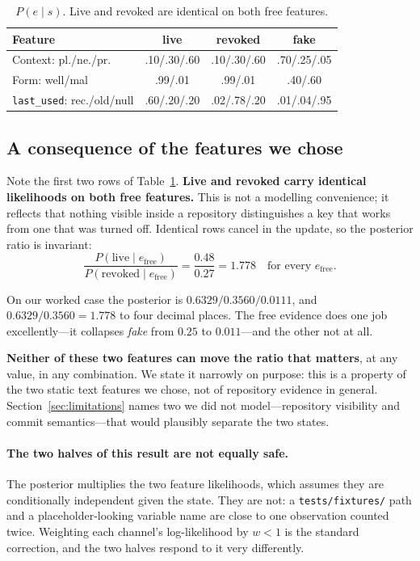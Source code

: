 \documentclass{article}
\begin{document}
\begin{table}[t]
\centering
\footnotesize
\setlength{\tabcolsep}{4pt}
\begin{tabular}{lccc}
\toprule
\textbf{Feature} & \textbf{live} & \textbf{revoked} & \textbf{fake} \\
\midrule
Context: pl./ne./pr. & .10/.30/.60 & .10/.30/.60 & .70/.25/.05 \\
Form: well/mal & .99/.01 & .99/.01 & .40/.60 \\
\texttt{last\_used}: rec./old/null & .60/.20/.20 & .02/.78/.20 & .01/.04/.95 \\
\bottomrule
\end{tabular}
\caption{$P(e \mid s)$. Live and revoked are identical on both free features.}
\label{tab:likelihoods}
\end{table}

\subsection{A consequence of the features we chose}
\label{sec:invariance}

Note the first two rows of Table~\ref{tab:likelihoods}. \textbf{Live and revoked
carry identical likelihoods on both free features.} This is not a modelling
convenience; it reflects that nothing visible inside a repository distinguishes
a key that works from one that was turned off. Identical rows cancel in the
update, so the posterior ratio is invariant:
\[
\frac{P(\text{live} \mid e_{\text{free}})}{P(\text{revoked} \mid e_{\text{free}})}
= \frac{0.48}{0.27} = 1.778 \quad \text{for every } e_{\text{free}}.
\]

On our worked case the posterior is $0.6329 / 0.3560 / 0.0111$, and
$0.6329/0.3560 = 1.778$ to four decimal places. The free evidence does one job
excellently---it collapses \emph{fake} from $0.25$ to $0.011$---and the other
not at all.

\textbf{Neither of these two features can move the ratio that matters}, at any
value, in any combination. We state it narrowly on purpose: this is a property
of the two static text features we chose, not of repository evidence in general.
Section~\ref{sec:limitations} names two we did not model---repository visibility
and commit semantics---that would plausibly separate the two states.

\paragraph{The two halves of this result are not equally safe.} The posterior
multiplies the two feature likelihoods, which assumes they are conditionally
independent given the state. They are not: a \texttt{tests/fixtures/} path and a
placeholder-looking variable name are close to one observation counted twice.
Weighting each channel's log-likelihood by $w < 1$ is the standard correction,
and the two halves respond to it very differently.
\end{document}
